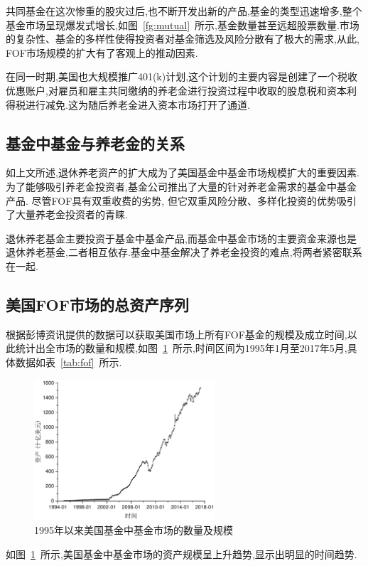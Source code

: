 \documentclass[10.5pt,onecolumn,a4paper]{article}%
\begin{document}
共同基金在这次惨重的股灾过后,也不断开发出新的产品,基金的类型迅速增多,整个基金市场呈现爆发式增长,如图~\ref{fg:mutual}~所示,基金数量甚至远超股票数量.市场的复杂性、基金的多样性使得投资者对基金筛选及风险分散有了极大的需求,从此, FOF市场规模的扩大有了客观上的推动因素.

在同一时期,美国也大规模推广401(k)计划,这个计划的主要内容是创建了一个税收优惠账户,对雇员和雇主共同缴纳的养老金进行投资过程中收取的股息税和资本利得税进行减免.这为随后养老金进入资本市场打开了通道.

\subsection{基金中基金与养老金的关系\label{sec:retire}}

如上文所述,退休养老资产的扩大成为了美国基金中基金市场规模扩大的重要因素.为了能够吸引养老金投资者,基金公司推出了大量的针对养老金需求的基金中基金产品. 尽管FOF具有双重收费的劣势, 但它双重风险分散、多样化投资的优势吸引了大量养老金投资者的青睐.

退休养老基金主要投资于基金中基金产品,而基金中基金市场的主要资金来源也是退休养老基金,二者相互依存.基金中基金解决了养老金投资的难点,将两者紧密联系在一起.

\subsection{美国FOF市场的总资产序列}
根据彭博资讯提供的数据可以获取美国市场上所有FOF基金的规模及成立时间,以此统计出全市场的数量和规模,如图~\ref{fg:fof}~所示,时间区间为1995年1月至2017年5月,具体数据如表~\ref{tab:fof}~所示.
\begin{figure}[ht]
  \centering
  \includegraphics[width=0.6\textwidth]{pic/fof.pdf}
  \caption{1995年以来美国基金中基金市场的数量及规模}\label{fg:fof}
\end{figure}

如图~\ref{fg:fof}~所示,美国基金中基金市场的资产规模呈上升趋势,显示出明显的时间趋势.
\end{document}
